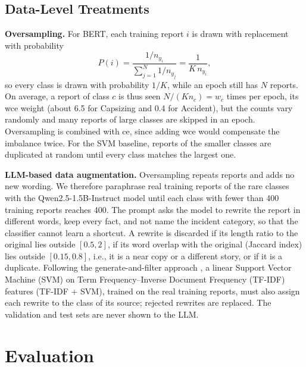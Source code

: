 \documentclass[conference]{IEEEtran}
\begin{document}
\subsection{Data-Level Treatments}\label{sec:data-level}

\textbf{Oversampling.} For BERT, each training report $i$ is drawn with replacement with probability
\begin{equation}
  P(i) = \frac{1/n_{y_i}}{\sum_{j=1}^{N} 1/n_{y_j}} = \frac{1}{K\, n_{y_i}},
\end{equation}
so every class is drawn with probability $1/K$, while an epoch still has $N$ reports. On average, a report of class $c$ is thus seen $N/(K n_c) = w_c$ times per epoch, its wce weight (about 6.5 for Capsizing and 0.4 for Accident), but the counts vary randomly and many reports of large classes are skipped in an epoch. Oversampling is combined with ce, since adding wce would compensate the imbalance twice. For the SVM baseline, reports of the smaller classes are duplicated at random until every class matches the largest one.

\textbf{LLM-based data augmentation.} Oversampling repeats reports and adds no new wording. We therefore paraphrase real training reports of the rare classes with the Qwen2.5-1.5B-Instruct model \cite{qwen2024qwen25} until each class with fewer than 400 training reports reaches 400. The prompt asks the model to rewrite the report in different words, keep every fact, and not name the incident category, so that the classifier cannot learn a shortcut. A rewrite is discarded if its length ratio to the original lies outside $[0.5, 2]$, if its word overlap with the original (Jaccard index) lies outside $[0.15, 0.8]$, i.e., it is a near copy or a different story, or if it is a duplicate. Following the generate-and-filter approach \cite{bayer2022survey}, a linear Support Vector Machine (SVM) on Term Frequency--Inverse Document Frequency (TF-IDF) features (TF-IDF + SVM), trained on the real training reports, must also assign each rewrite to the class of its source; rejected rewrites are replaced. The validation and test sets are never shown to the LLM.

\section{Evaluation}\label{sec:eval}
\end{document}
